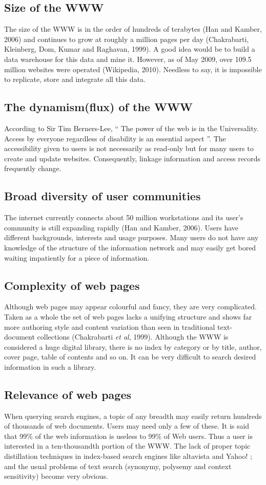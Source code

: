 \documentclass{article}
\begin{document}
\subsection{Size of the WWW}
The size of the WWW is in the order of hundreds of terabytes (Han and Kamber, 2006) and continues to grow at roughly a million pages per day (Chakrabarti, Kleinberg, Dom, Kumar and Raghavan, 1999). A good idea would be to build a data warehouse for this data and mine it. However, as of May 2009, over 109.5 million websites were operated (Wikipedia, 2010). Needless to say, it is impossible to replicate, store and integrate all this data.
\subsection{The dynamism(flux) of the WWW}
According to Sir Tim Berners-Lee, “ The power of the web is in the Universality. Access by everyone regardless of disability is an essential aspect ”. The accessibility given to users is not necessarily as read-only but for many users to create and update websites. Consequently, linkage information and access records frequently change.
\subsection{Broad diversity of user communities}
The internet currently connects about 50 million workstations and its user’s community is still expanding rapidly (Han and Kamber, 2006). Users have different backgrounds, interests and usage purposes. Many users do not have any knowledge of the structure of the information network and may easily get bored waiting impatiently for a piece of information.
\subsection{Complexity of web pages}
Although web pages may appear colourful and fancy, they are very complicated. Taken as a whole the set of web pages lacks a unifying structure and shows far more authoring style and content variation than seen in traditional text-document collections (Chakrabarti \textit{et al}, 1999). Although the WWW is considered a huge digital library, there is no index by category or by title, author, cover page, table of contents and so on. It can be very difficult to search desired information in such a library.

\subsection{Relevance of web pages}
When querying search engines, a topic of any breadth may easily return hundreds of thousands of web documents. Users may need only a few of these. It is said that 99\% of the web information is useless to 99\% of Web users. Thus a user is interested in a ten-thousandth portion of the WWW. The lack of proper topic distillation techniques in index-based search engines like altavista and Yahoo! ; and the usual problems of text search (synonymy, polysemy and context sensitivity) become very obvious.
\end{document}
